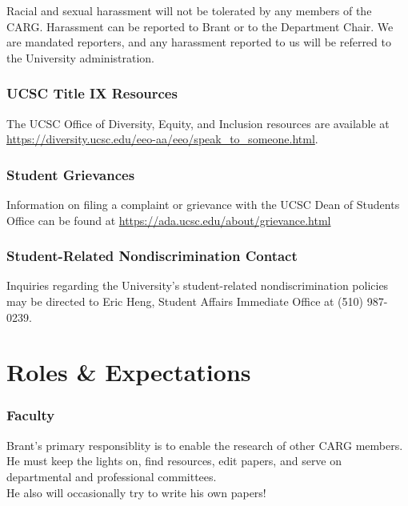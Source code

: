 \documentclass[fleqn,10pt]{wlscirep}
\begin{document}
Racial and sexual harassment will not be tolerated by any members of
the CARG. Harassment can be reported to Brant or to the Department Chair.
We are mandated reporters, and any harassment reported to us will be
referred to the University administration.\\


\subsubsection{UCSC Title IX Resources}

The UCSC Office of Diversity, Equity, and Inclusion resources are available at
\href{https://diversity.ucsc.edu/eeo-aa/eeo/speak_to_someone.html}{https://diversity.ucsc.edu/eeo-aa/eeo/speak\_to\_someone.html}.

\subsubsection{Student Grievances}
\label{sec:student_grievances}

\noindent
Information on filing a complaint or grievance with the UCSC Dean of Students Office
can be found at
\href{https://ada.ucsc.edu/about/grievance.html}{https://ada.ucsc.edu/about/grievance.html}

\subsubsection{Student-Related Nondiscrimination Contact}
Inquiries regarding the University's student-related nondiscrimination policies may be directed to Eric Heng, Student Affairs Immediate Office at (510) 987-0239.

\newpage
\section{Roles \& Expectations}
\label{sec:roles}

\subsubsection{Faculty}

Brant's primary responsiblity
is to enable the research
of other CARG members. He
must keep the lights on,
find resources, edit
papers, and serve on departmental
and professional committees.\\

\noindent
He also will occasionally try to
write his own papers!
\end{document}
